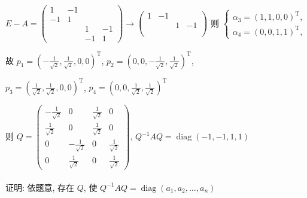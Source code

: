 \begin{enumerate}
                   \( E-A = \begin{pmatrix}
                       1  & -1 &    &    \\
                       -1 & 1  &    &    \\
                          &    & 1  & -1 \\
                          &    & -1 & 1
                   \end{pmatrix} \rightarrow \begin{pmatrix}
                       1 & -1 &   &    \\
                         &    & 1 & -1 \\
                         &    &   &    \\
                         &    &   &
                   \end{pmatrix} \) 则 \( \begin{cases} \alpha_{3} = (1, 1, 0, 0)^{\mathrm{T}}, \\ \alpha_{4} = (0, 0, 1, 1)^{\mathrm{T}}, \end{cases} \)

                   故 \( p_{1} = \left( -\frac{1}{\sqrt{2}}, \frac{1}{\sqrt{2}}, 0, 0 \right)^{\mathrm{T}} \), \( p_{2} = \left( 0, 0, -\frac{1}{\sqrt{2}}, \frac{1}{\sqrt{2}} \right)^{\mathrm{T}} \),

                   \( p_{3} = \left( \frac{1}{\sqrt{2}}, \frac{1}{\sqrt{2}}, 0, 0 \right)^{\mathrm{T}} \), \( p_{4} = \left( 0, 0, \frac{1}{\sqrt{2}}, \frac{1}{\sqrt{2}} \right)^{\mathrm{T}} \)

                   则 \( Q = \begin{pmatrix}
                       -\frac{1}{\sqrt{2}} & 0                   & \frac{1}{\sqrt{2}} & 0                  \\
                       \frac{1}{\sqrt{2}}  & 0                   & \frac{1}{\sqrt{2}} & 0                  \\
                       0                   & -\frac{1}{\sqrt{2}} & 0                  & \frac{1}{\sqrt{2}} \\
                       0                   & \frac{1}{\sqrt{2}}  & 0                  & \frac{1}{\sqrt{2}}
                   \end{pmatrix} \), \( Q^{-1}AQ = \operatorname{diag}(-1, -1, 1, 1) \)
         \end{enumerate}


     \paragraph{} %
         证明: 依题意, 存在 \( Q \), 使 \( Q^{-1}AQ = \operatorname{diag}(a_{1}, a_{2}, \dots, a_{n}) \)


